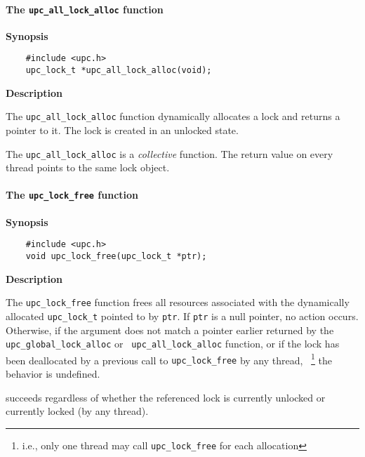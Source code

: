 \paragraph{The {\tt upc\_all\_lock\_alloc} function}

{\bf Synopsis} 

\npf\vspace{-2.5em}
\begin{verbatim}
    #include <upc.h> 
    upc_lock_t *upc_all_lock_alloc(void); 
\end{verbatim}

{\bf Description}

\np The {\tt upc\_all\_lock\_alloc} function dynamically
    allocates a lock and returns a pointer to it. The lock is created
    in an unlocked state.

\np The {\tt upc\_all\_lock\_alloc} is a {\em collective}
    function.  The return value on every thread points to the same
    lock object.

\paragraph{The {\tt upc\_lock\_free} function}

{\bf Synopsis} 

\npf\vspace{-2.5em}
\begin{verbatim}
    #include <upc.h> 
    void upc_lock_free(upc_lock_t *ptr); 
\end{verbatim}

{\bf Description}

\np The {\tt upc\_lock\_free} function frees all resources
    associated with the dynamically allocated {\tt upc\_lock\_t} pointed to
    by {\tt ptr}.  If {\tt ptr} is a null pointer, no action occurs.
    Otherwise, if the argument does not match a pointer earlier
    returned by the {\tt upc\_global\_lock\_alloc} or {\tt
    upc\_all\_lock\_alloc} function, or if the lock has been
    deallocated by a previous call to {\tt upc\_lock\_free} by any thread,~%
    \footnote
    {i.e., only one thread may call {\tt upc\_lock\_free} for each
    allocation} 
    the behavior is undefined.

 succeeds regardless of whether the
    referenced lock is currently unlocked or currently locked (by any
    thread).

